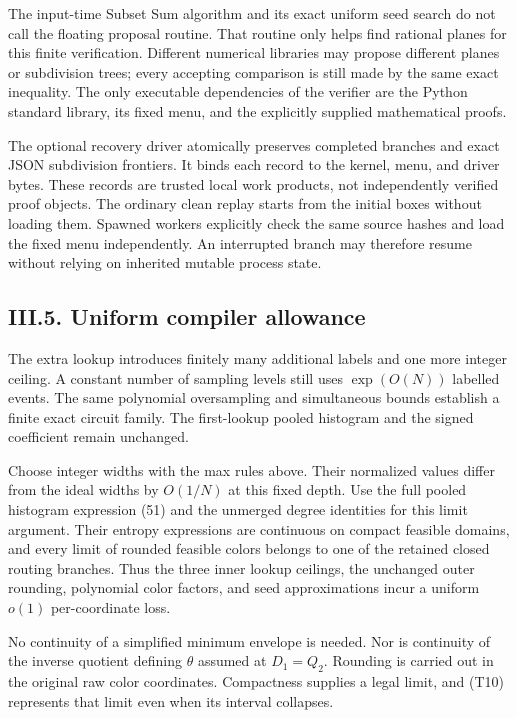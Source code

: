 The input-time Subset Sum algorithm and its exact uniform seed search do not call the floating proposal routine. That routine only helps find rational planes for this finite verification. Different numerical libraries may propose different planes or subdivision trees; every accepting comparison is still made by the same exact inequality. The only executable dependencies of the verifier are the Python standard library, its fixed menu, and the explicitly supplied mathematical proofs.

The optional recovery driver atomically preserves completed branches and exact JSON subdivision frontiers. It binds each record to the kernel, menu, and driver bytes. These records are trusted local work products, not independently verified proof objects. The ordinary clean replay starts from the initial boxes without loading them. Spawned workers explicitly check the same source hashes and load the fixed menu independently. An interrupted branch may therefore resume without relying on inherited mutable process state.

\hypertarget{af-a9ec399514-iii.5.-uniform-compiler-allowance}{%
\subsection{III.5. Uniform compiler allowance}\label{af-a9ec399514-iii.5.-uniform-compiler-allowance}}

The extra lookup introduces finitely many additional labels and one more integer ceiling. A constant number of sampling levels still uses \(\exp(O(N))\) labelled events. The same polynomial oversampling and simultaneous bounds establish a finite exact circuit family. The first-lookup pooled histogram and the signed coefficient remain unchanged.

Choose integer widths with the max rules above. Their normalized values differ from the ideal widths by \(O(1/N)\) at this fixed depth. Use the full pooled histogram expression (51) and the unmerged degree identities for this limit argument. Their entropy expressions are continuous on compact feasible domains, and every limit of rounded feasible colors belongs to one of the retained closed routing branches. Thus the three inner lookup ceilings, the unchanged outer rounding, polynomial color factors, and seed approximations incur a uniform \(o(1)\) per-coordinate loss.

No continuity of a simplified minimum envelope is needed. Nor is continuity of the inverse quotient defining \(\theta\) assumed at \(D_1=Q_2\). Rounding is carried out in the original raw color coordinates. Compactness supplies a legal limit, and (T10) represents that limit even when its interval collapses.

